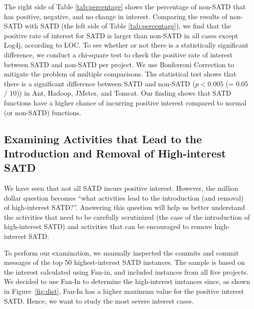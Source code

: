 \documentclass[10pt, conference]{IEEEtran}
\newcommand{\emad}[1]{{\color{red}{\textbf{Emad: [#1]}}}}
\newcommand{\smallsection}[1]{\vspace{1mm}\noindent {\bf #1}.\hspace{2mm}}
\begin{document}

The right side of Table \ref{tab:percentage} shows the percentage of non-SATD that has positive, negative, and no change in interest. Comparing the results of non-SATD with SATD (the left side of Table \ref{tab:percentage}), we find that the positive rate of interest for SATD is larger than non-SATD in all cases except Log4j, according to LOC. To see whether or not there is a statistically significant difference, we conduct a chi-square test to check the positive rate of interest between SATD and non-SATD per project. We use Bonferroni Correction to mitigate the problem of multiple comparisons. The statistical test shows that there is a significant difference between SATD and non-SATD ($p < 0.005$ (= $0.05$ / $10$)) in Ant, Hadoop, JMeter, and Tomcat. 
Our finding shows that SATD functions have a higher chance of incurring positive interest compared to normal (or non-SATD) functions.



\subsection{Examining Activities that Lead to the Introduction and Removal of High-interest SATD}

We have seen that not all SATD incurs positive interest. However, the million dollar question becomes ``what activities lead to the introduction (and removal) of high-interest SATD?''. Answering this question will help us better understand the activities that need to be carefully scrutinized (the case of the introduction of high-interest SATD) and activities that can be encouraged to remove high-interest SATD.




To perform our examination, we manually inspected the commits and commit messages of the top 50 highest-interest SATD instances. The sample is based on the interest calculated using Fan-in, and included instances from all five projects. We decided to use Fan-In to determine the high-interest instances since, as shown in Figure~\ref{fig:dist}, Fan-In has a higher maximum value for the positive interest SATD. Hence, we want to study the most severe interest cases.
\end{document}
